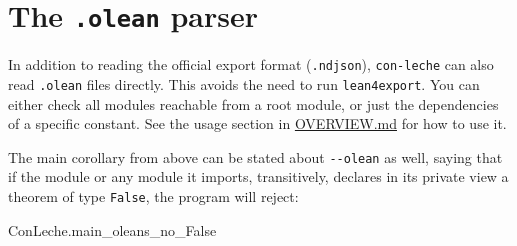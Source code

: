 \documentclass{article}
\newcommand\code[1]{\texttt{#1}}
\begin{document}
\section*{The \code{.olean} parser}

In addition to reading the official export format (\code{.ndjson}), \code{con-leche} can also read \code{.olean} files directly. This avoids the need to run \code{lean4export}. You can either check all modules reachable from a root module, or just the dependencies of a specific constant. See the usage section in \href{https://github.com/leanprover/con-leche/blob/master/OVERVIEW.md#0-using-the-checker}{OVERVIEW.md} for how to use it.

The main corollary from above can be stated about \code{-{}-olean} as well, saying that if the module or any module it imports, transitively, declares in its private view a theorem of type \code{False}, the program will reject:

\begin{leanblock}[view=lean, sum=UUXVP5eCTg]{ConLeche.main_oleans_no_False}{}
\end{leanblock}
\end{document}
